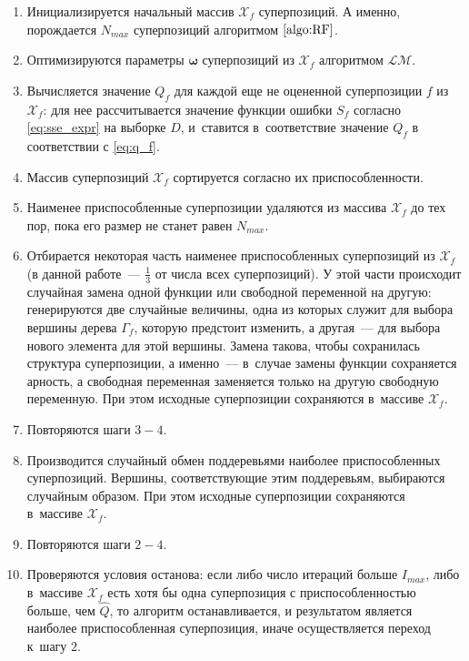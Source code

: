 \documentclass[12pt,a4paper]{article}
\begin{document}
\begin{enumerate}
  \item Инициализируется начальный массив $\mathcal{X}_f$ суперпозиций.
	А именно, порождается $N_{max}$ суперпозиций алгоритмом $\ref{algo:RF}$.
  \item Оптимизируются параметры $\boldsymbol{\omega}$ суперпозиций
	из $\mathcal{X}_f$ алгоритмом $\mathcal{LM}$.
  \item Вычисляется значение $Q_f$ для каждой еще не оцененной суперпозиции $f$ из
	$\mathcal{X}_f$: для нее рассчитывается значение функции ошибки $S_f$
	согласно \eqref{eq:sse_expr} на выборке $D$, и~ставится в~соответствие
	значение $Q_f$ в соответствии с \eqref{eq:q_f}.
  \item Массив суперпозиций $\mathcal{X}_f$ сортируется согласно их
	приспособленности.
  \item Наименее приспособленные суперпозиции удаляются из массива
	$\mathcal{X}_f$ до тех пор, пока его размер не станет равен $N_{max}$.
  \item Отбирается некоторая часть наименее приспособленных суперпозиций из
	$\mathcal{X}_f$ (в данной работе~--- $\frac{1}{3}$ от числа всех суперпозиций).
	У этой части происходит случайная замена одной функции
	или свободной переменной на другую: генерируются две случайные величины,
	одна из которых служит для выбора вершины дерева $\Gamma_f$, которую
	предстоит изменить, а другая~--- для выбора нового элемента для этой вершины.
	Замена такова, чтобы сохранилась структура суперпозиции, а именно~---
	в~случае замены функции сохраняется арность, а свободная переменная
	заменяется только на другую свободную переменную. При этом исходные
	суперпозиции сохраняются в~массиве $\mathcal{X}_f$.
  \item Повторяются шаги $3-4$.
  \item Производится случайный обмен поддеревьями наиболее приспособленных
	суперпозиций. Вершины, соответствующие этим поддеревьям, выбираются
	случайным образом. При этом исходные суперпозиции сохраняются в~массиве
	$\mathcal{X}_f$.
  \item Повторяются шаги $2-4$.
  \item Проверяются условия останова: если либо число итераций больше
	$I_{max}$, либо в~массиве $\mathcal{X}_f$ есть хотя бы одна суперпозиция с
	приспособленностью больше, чем $\hat{Q}$, то алгоритм останавливается,
	и результатом является наиболее приспособленная суперпозиция, иначе
	осуществляется переход к~шагу $2$.
\end{enumerate}
\end{document}
